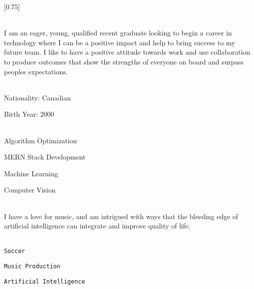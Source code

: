 \documentclass[darkhipster]{simplehipstercv}
\begin{document}
\setlength{\columnsep}{1.5cm}
[0.75]
\begin{paracol}{2}

\paracolbackgroundoptions


\footnotesize
{\setasidefontcolour
\flushright
\begin{center}
\end{center}

\\[0.5em]

{\footnotesize
I am an eager, young, qualified recent graduate looking to begin a career in technology where I can be a positive impact and help to bring success to my future team. I like to have a positive attitude towards work and use collaboration to produce outcomes that show the strengths of everyone on board and surpass peoples expectations.
}

\bigskip

 \\[0.5em]

Nationality: Canadian 

Birth Year: 2000

\bigskip

 \\[0.5em]

Algorithm Optimization

MERN Stack Development

Machine Learning

Computer Vision

\bigskip


\\[0.5em]
I have a love for music, and am intrigued with ways that the bleeding edge of artificial intelligence can integrate and improve quality of life.

\bigskip

\\[0.5em]

\texttt{Soccer}

\texttt{Music Production}

\texttt{Artificial Intelligence}

\vspace{4em}

\bigskip
{}
\bigskip
{}
\bigskip
{}
\bigskip
{}


}
\end{paracol}
\end{document}
